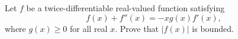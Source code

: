 Let $f$ be a twice-differentiable real-valued function satisfying
\[f(x)+f''(x)=-xg(x)f'(x),\]
where $g(x)\geq 0$ for all real $x$.  Prove that $|f(x)|$ is bounded.
